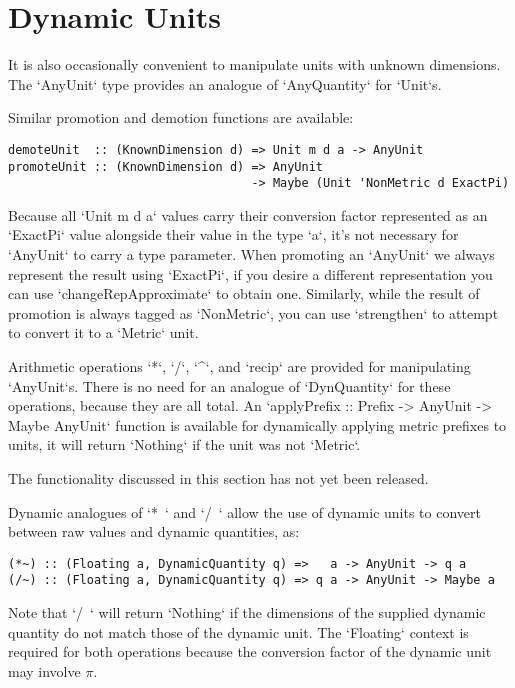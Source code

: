 \documentclass[11pt]{report}
\newcommand{\prerelease}{\begin{framed}
The functionality discussed in this section has not yet been released.
\end{framed}}
\begin{document}
\section{Dynamic Units}

It is also occasionally convenient to manipulate units with unknown dimensions. The `AnyUnit` type provides
an analogue of `AnyQuantity` for `Unit`s.

Similar promotion and demotion functions are available:

\begin{lstlisting}
demoteUnit  :: (KnownDimension d) => Unit m d a -> AnyUnit
promoteUnit :: (KnownDimension d) => AnyUnit
                                  -> Maybe (Unit 'NonMetric d ExactPi)
\end{lstlisting}

Because all `Unit m d a` values carry their conversion factor represented as an `ExactPi` value alongside their value in
the type `a`, it's not necessary for `AnyUnit` to carry a type parameter. When promoting an `AnyUnit` we always represent
the result using `ExactPi`, if you desire a different representation you can use `changeRepApproximate` to obtain one.
Similarly, while the result of promotion is always tagged as `NonMetric`, you can use `strengthen` to attempt to convert
it to a `Metric` unit.

Arithmetic operations `*`, `/`, `^`, and `recip` are provided for manipulating `AnyUnit`s. There is no need for an analogue
of `DynQuantity` for these operations, because they are all total. An `applyPrefix :: Prefix -> AnyUnit -> Maybe AnyUnit`
function is available for dynamically applying metric prefixes to units, it will return `Nothing` if the unit was not `Metric`.

\prerelease{}

Dynamic analogues of `*~` and `/~` allow the use of dynamic units to convert between raw values and dynamic quantities, as:

\begin{lstlisting}
(*~) :: (Floating a, DynamicQuantity q) =>   a -> AnyUnit -> q a
(/~) :: (Floating a, DynamicQuantity q) => q a -> AnyUnit -> Maybe a
\end{lstlisting}

Note that `/~` will return `Nothing` if the dimensions of the supplied dynamic quantity do not match those of the
dynamic unit. The `Floating` context is required for both operations because the conversion factor of the
dynamic unit may involve $ \pi $.
\end{document}
